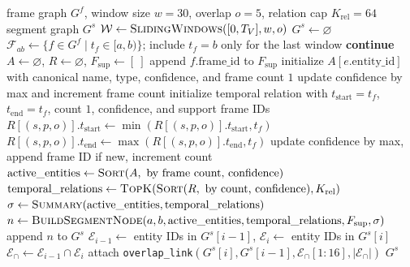 \documentclass[sigconf, screen, review, anonymous]{acmart}
\begin{document}
\begin{algorithm}[t]
\caption{Stage-2 Segment Graph Aggregation}
\label{alg:app-segment}
\footnotesize
\begin{algorithmic}[1]
\Require frame graph $G^f$, window size $w=30$, overlap $o=5$, relation cap $K_{\mathrm{rel}}=64$
\Ensure segment graph $G^s$
\State $\mathcal{W} \gets \textsc{SlidingWindows}([0,T_V], w, o)$
\State $G^s \gets \varnothing$
    \State $\mathcal{F}_{ab} \gets \{f \in G^f \mid t_f \in [a,b)\}$; include $t_f=b$ only for the last window
        \State \textbf{continue}
    \EndIf
    \State $A \gets \varnothing$, $R \gets \varnothing$, $F_{\mathrm{sup}} \gets [\ ]$
        \State append $f.\mathrm{frame\_id}$ to $F_{\mathrm{sup}}$
                \State initialize $A[e.\mathrm{entity\_id}]$ with canonical name, type, confidence, and frame count $1$
            \Else
                \State update confidence by max and increment frame count
            \EndIf
        \EndFor
                \State initialize temporal relation with $t_{\mathrm{start}}=t_f$, $t_{\mathrm{end}}=t_f$, count $1$, confidence, and support frame IDs
            \Else
                \State $R[(s,p,o)].t_{\mathrm{start}} \gets \min(R[(s,p,o)].t_{\mathrm{start}}, t_f)$
                \State $R[(s,p,o)].t_{\mathrm{end}} \gets \max(R[(s,p,o)].t_{\mathrm{end}}, t_f)$
                \State update confidence by max, append frame ID if new, increment count
            \EndIf
        \EndFor
    \EndFor
    \State $\mathrm{active\_entities} \gets \textsc{Sort}(A,\text{ by frame count, confidence})$
    \State $\mathrm{temporal\_relations} \gets \textsc{TopK}(\textsc{Sort}(R,\text{ by count, confidence}), K_{\mathrm{rel}})$
    \State $\sigma \gets \textsc{Summary}(\mathrm{active\_entities}, \mathrm{temporal\_relations})$
    \State $n \gets \textsc{BuildSegmentNode}(a,b,\mathrm{active\_entities},\mathrm{temporal\_relations},F_{\mathrm{sup}},\sigma)$
    \State append $n$ to $G^s$
\EndFor
{}
    \State $\mathcal{E}_{i-1} \gets$ entity IDs in $G^s[i-1]$, $\mathcal{E}_i \gets$ entity IDs in $G^s[i]$
    \State $\mathcal{E}_{\cap} \gets \mathcal{E}_{i-1}\cap\mathcal{E}_i$
        \State attach \texttt{overlap\_link}$(G^s[i], G^s[i-1], \mathcal{E}_{\cap}[1{:}16], |\mathcal{E}_{\cap}|)$
    \EndIf
\EndFor
\State \Return $G^s$
\end{algorithmic}
\end{algorithm}
\end{document}
